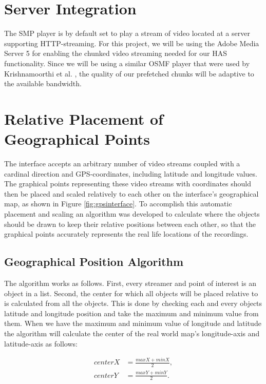 \section{Server Integration}
\label{sec:serverintegration}

The SMP player is by default set to play a stream of video located at a server supporting HTTP-streaming. For this project, we will be using the Adobe Media Server 5 for enabling the chunked video streaming needed for our HAS functionality. Since we will be using a similar OSMF player that were used by Krishnamoorthi et al. \cite{hasmultipath}, the quality of our prefetched chunks will be adaptive to the available bandwidth\cite{hasmultipath}.

\section{Relative Placement of Geographical Points}
\label{sec:relativeplacement}

The interface accepts an arbitrary number of video streams coupled with a cardinal direction and GPS-coordinates, including latitude and longitude values. The graphical points representing these video streams with coordinates should then be placed and scaled relatively to each other on the interface's geographical map, as shown in Figure \ref{fig:gpsinterface}. To accomplish this automatic placement and scaling an algorithm was developed to calculate where the objects should be drawn to keep their relative positions between each other, so that the graphical points accurately represents the real life locations of the recordings.

\subsection{Geographical Position Algorithm}
\label{sec:geoalgorithm}

The algorithm works as follows. First, every streamer and point of interest is an object in a list. Second, the center for which all objects will be placed relative to is calculated from all the objects. This is done by checking each and every objects latitude and longitude position and take the maximum and minimum value from them. When we have the maximum and minimum value of longitude and latitude the algorithm will calculate the center of the real world map's longitude-axis and latitude-axis as follows:

\begin{align}
\label{eq:center}
centerX &= \frac{maxX+minX}{2},  \\
centerY &= \frac{maxY+minY}{2}. \nonumber
\end{align}

